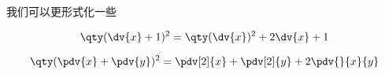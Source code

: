 
我们可以更形式化一些

\begin{equation}
\qty(\dv{x} + 1)^2 = \qty(\dv{x})^2 + 2\dv{x} + 1
\end{equation}

\begin{equation}
\qty(\pdv{x} + \pdv{y})^2 = \pdv[2]{x} + \pdv[2]{y} + 2\pdv{}{x}{y}
\end{equation}

\begin{equation}

\end{equation}